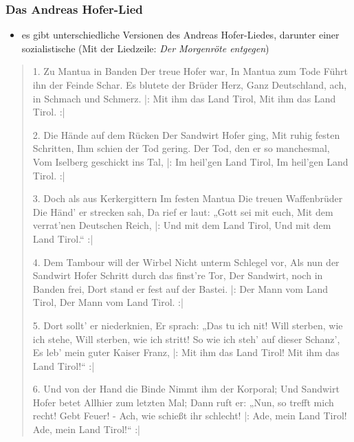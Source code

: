\documentclass[11pt,a4paper]{article}
\begin{document}
\subsubsection*{\color{bluecolor} Das Andreas Hofer-Lied}

\begin{itemize}


\item es gibt unterschiedliche Versionen des Andreas Hofer-Liedes, darunter einer sozialistische (Mit der Liedzeile: \emph{Der Morgenröte entgegen})


\end{itemize}



\begin{verse}

1. Zu Mantua in Banden
Der treue Hofer war,
In Mantua zum Tode
Führt ihn der Feinde Schar.
Es blutete der Brüder Herz,
Ganz Deutschland, ach, in Schmach und Schmerz.
|: Mit ihm das Land Tirol,
Mit ihm das Land Tirol. :|

2. Die Hände auf dem Rücken
Der Sandwirt Hofer ging,
Mit ruhig festen Schritten,
Ihm schien der Tod gering.
Der Tod, den er so manchesmal,
Vom Iselberg geschickt ins Tal,
|: Im heil’gen Land Tirol,
Im heil’gen Land Tirol. :|

3. Doch als aus Kerkergittern
Im festen Mantua
Die treuen Waffenbrüder
Die Händ’ er strecken sah,
Da rief er laut: „Gott sei mit euch,
Mit dem verrat’nen Deutschen Reich,
|: Und mit dem Land Tirol,
Und mit dem Land Tirol.“ :|

4. Dem Tambour will der Wirbel
Nicht unterm Schlegel vor,
Als nun der Sandwirt Hofer
Schritt durch das finst’re Tor,
Der Sandwirt, noch in Banden frei,
Dort stand er fest auf der Bastei.
|: Der Mann vom Land Tirol,
Der Mann vom Land Tirol. :|

5. Dort sollt’ er niederknien,
Er sprach: „Das tu ich nit!
Will sterben, wie ich stehe,
Will sterben, wie ich stritt!
So wie ich steh’ auf dieser Schanz’,
Es leb’ mein guter Kaiser Franz,
|: Mit ihm das Land Tirol!
Mit ihm das Land Tirol!“ :|

6. Und von der Hand die Binde
Nimmt ihm der Korporal;
Und Sandwirt Hofer betet
Allhier zum letzten Mal;
Dann ruft er: „Nun, so trefft mich recht!
Gebt Feuer! - Ach, wie schießt ihr schlecht!
|: Ade, mein Land Tirol!
Ade, mein Land Tirol!“ :|


\end{verse}
\end{document}
